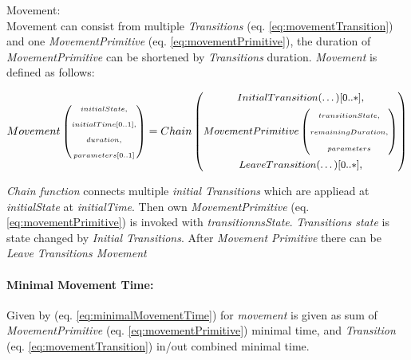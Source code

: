     \begin{definition}{Movement:}\label{def:Movement}\\
        Movement can consist from multiple \emph{Transitions} (eq. \ref{eq:movementTransition}) and one \emph{MovementPrimitive} (eq. \ref{eq:movementPrimitive}), the duration of \emph{MovementPrimitive} can be shortened by \emph{Transitions} duration. \emph{Movement} is defined as follows:
        
        \begin{equation}
            \small Movement \left(
                \begin{gathered}
                    \scriptstyle initialState,\\
                    \scriptstyle initialTime[0..1],\\ 
                    \scriptstyle duration,\\ 
                    \scriptstyle parameters[0..1]
                \end{gathered}\right)
            = \small Chain \left(
            \begin{gathered}
            \small InitialTransition(\dots)[0..*],\\
            \small MovementPrimitive\left(
            \begin{gathered}
                \scriptstyle transitionState,\\
                \scriptstyle remainingDuration,\\
                \scriptstyle parameters
            \end{gathered}\right)\\
            \small LeaveTransition(\dots)[0..*],\\
            \end{gathered}
            \right)
        \end{equation}
        
        \emph{Chain function} connects multiple \emph{initial Transitions} which are appliead at \emph{initialState} at \emph{initialTime}. Then own \emph{MovementPrimitive} (eq. \ref{eq:movementPrimitive}) is invoked with \emph{transitionnsState}. \emph{Transitions state} is state changed by \emph{Initial Transitions}. After \emph{Movement Primitive} there can be \emph{Leave Transitions Movement}
    \end{definition}

    \paragraph{Minimal Movement Time:} Given by (eq. \ref{eq:minimalMovementTime}) for \emph{movement} is given as sum of \emph{MovementPrimitive} (eq. \ref{eq:movementPrimitive}) minimal time, and \emph{Transition} (eq. \ref{eq:movementTransition}) in/out combined minimal time.
    
